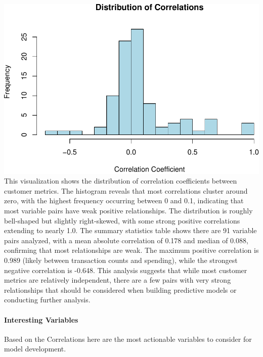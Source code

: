 \documentclass[
]{article}
\begin{document}
\includegraphics{capstone_customer_segmentation_files/figure-latex/correlation-analysis7-1.pdf}
This visualization shows the distribution of correlation coefficients
between customer metrics. The histogram reveals that most correlations
cluster around zero, with the highest frequency occurring between 0 and
0.1, indicating that most variable pairs have weak positive
relationships. The distribution is roughly bell-shaped but slightly
right-skewed, with some strong positive correlations extending to nearly
1.0. The summary statistics table shows there are 91 variable pairs
analyzed, with a mean absolute correlation of 0.178 and median of 0.088,
confirming that most relationships are weak. The maximum positive
correlation is 0.989 (likely between transaction counts and spending),
while the strongest negative correlation is -0.648. This analysis
suggests that while most customer metrics are relatively independent,
there are a few pairs with very strong relationships that should be
considered when building predictive models or conducting further
analysis.\newpage

\paragraph{Interesting Variables}\label{interesting-variables}

Based on the Correlations here are the most actionable variables to
consider for model development.
\end{document}

